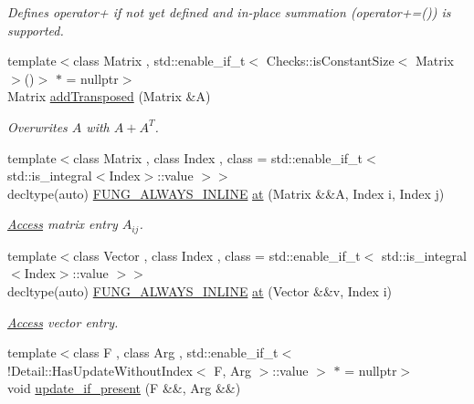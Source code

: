 \begin{DoxyCompactItemize}
\begin{DoxyCompactList}\small\item\em Defines operator+ if not yet defined and in-\/place summation (operator+=()) is supported. \end{DoxyCompactList}\item 
{\footnotesize template$<$class Matrix , std\-::enable\-\_\-if\-\_\-t$<$ Checks\-::is\-Constant\-Size$<$ Matrix $>$()$>$ $\ast$  = nullptr$>$ }\\Matrix \hyperlink{namespaceFunG_a0211d0d26c669d56b5113fd2292902e5}{add\-Transposed} (Matrix \&A)
\begin{DoxyCompactList}\small\item\em Overwrites $A$ with $A+A^T$. \end{DoxyCompactList}\item 
{\footnotesize template$<$class Matrix , class Index , class  = std\-::enable\-\_\-if\-\_\-t$<$ std\-::is\-\_\-integral$<$\-Index$>$\-::value $>$$>$ }\\decltype(auto) \hyperlink{macros_8hh_a03b9da186125795e5afa49d0ef1cc32f}{F\-U\-N\-G\-\_\-\-A\-L\-W\-A\-Y\-S\-\_\-\-I\-N\-L\-I\-N\-E} \hyperlink{namespaceFunG_aae631e6149505bdfc0b1c6162b370c7f}{at} (Matrix \&\&A, Index i, Index j)
\begin{DoxyCompactList}\small\item\em \hyperlink{namespaceFunG_1_1Access}{Access} matrix entry $A_{ij}$. \end{DoxyCompactList}\item 
{\footnotesize template$<$class Vector , class Index , class  = std\-::enable\-\_\-if\-\_\-t$<$ std\-::is\-\_\-integral$<$\-Index$>$\-::value $>$$>$ }\\decltype(auto) \hyperlink{macros_8hh_a03b9da186125795e5afa49d0ef1cc32f}{F\-U\-N\-G\-\_\-\-A\-L\-W\-A\-Y\-S\-\_\-\-I\-N\-L\-I\-N\-E} \hyperlink{namespaceFunG_aa40271c9228c5ccee8a4973f27918630}{at} (Vector \&\&v, Index i)
\begin{DoxyCompactList}\small\item\em \hyperlink{namespaceFunG_1_1Access}{Access} vector entry. \end{DoxyCompactList}\item 
{\footnotesize template$<$class F , class Arg , std\-::enable\-\_\-if\-\_\-t$<$!\-Detail\-::\-Has\-Update\-Without\-Index$<$ F, Arg $>$\-::value $>$ $\ast$  = nullptr$>$ }\\void \hyperlink{namespaceFunG_a3b9d2e5d07b30c2ee26703b33e9adb9e}{update\-\_\-if\-\_\-present} (F \&\&, Arg \&\&)
\item 

\end{DoxyCompactItemize}
